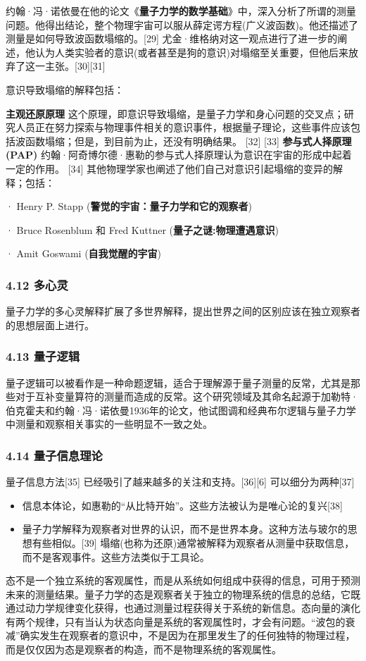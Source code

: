 约翰·冯·诺依曼在他的论文《\textbf{量子力学的数学基础}》中，深入分析了所谓的测量问题。他得出结论，整个物理宇宙可以服从薛定谔方程(广义波函数)。他还描述了测量是如何导致波函数塌缩的。[29] 尤金·维格纳对这一观点进行了进一步的阐述，他认为人类实验者的意识(或者甚至是狗的意识)对塌缩至关重要，但他后来放弃了这一主张。[30][31]

意识导致塌缩的解释包括：

\textbf{主观还原原理}
这个原理，即意识导致塌缩，是量子力学和身心问题的交叉点；研究人员正在努力探索与物理事件相关的意识事件，根据量子理论，这些事件应该包括波函数塌缩；但是，到目前为止，还没有明确结果。 [32] [33]
\textbf{参与式人择原理(PAP)}
约翰·阿奇博尔德·惠勒的参与式人择原理认为意识在宇宙的形成中起着一定的作用。 [34]
其他物理学家也阐述了他们自己对意识引起塌缩的变异的解释；包括：

·        Henry P. Stapp (\textbf{警觉的宇宙：量子力学和它的观察者})

·        Bruce Rosenblum 和 Fred Kuttner (\textbf{量子之谜:物理遭遇意识})

·        Amit Goswami (\textbf{自我觉醒的宇宙})

\subsubsection{4.12 多心灵}

量子力学的多心灵解释扩展了多世界解释，提出世界之间的区别应该在独立观察者的思想层面上进行。

\subsubsection{4.13 量子逻辑}

量子逻辑可以被看作是一种命题逻辑，适合于理解源于量子测量的反常，尤其是那些对于互补变量算符的测量而造成的反常。这个研究领域及其命名起源于加勒特·伯克霍夫和约翰·冯·诺依曼1936年的论文，他试图调和经典布尔逻辑与量子力学中测量和观察相关事实的一些明显不一致之处。

\subsubsection{4.14 量子信息理论}

量子信息方法[35] 已经吸引了越来越多的关注和支持。[36][6] 可以细分为两种[37]

\begin{itemize}
\item 信息本体论，如惠勒的“从比特开始”。这些方法被认为是唯心论的复兴[38]
\item 量子力学解释为观察者对世界的认识，而不是世界本身。这种方法与玻尔的思想有些相似。[39] 塌缩(也称为还原)通常被解释为观察者从测量中获取信息，而不是客观事件。这些方法类似于工具论。
\end{itemize}

态不是一个独立系统的客观属性，而是从系统如何组成中获得的信息，可用于预测未来的测量结果。量子力学的态是观察者关于独立的物理系统的信息的总结，它既通过动力学规律变化获得，也通过测量过程获得关于系统的新信息。态向量的演化有两个规律，只有当认为状态向量是系统的客观属性时，才会有问题。“波包的衰减”确实发生在观察者的意识中，不是因为在那里发生了的任何独特的物理过程，而是仅仅因为态是观察者的构造，而不是物理系统的客观属性。

